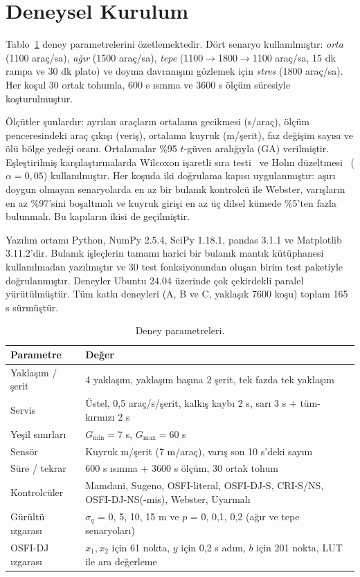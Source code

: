 \documentclass[11pt,a4paper]{article}
\theoremstyle{definition}
\newcommand{\osfis}{OSFI-DJ-S}
\newcommand{\osfins}{OSFI-DJ-NS}
\begin{document}
\section{Deneysel Kurulum}
\label{sec:setup}

Tablo~\ref{tab:setup} deney parametrelerini özetlemektedir. Dört senaryo kullanılmıştır: \emph{orta} (1100 araç/sa), \emph{ağır} (1500 araç/sa), \emph{tepe} (1100$\to$1800$\to$1100 araç/sa, 15 dk rampa ve 30 dk plato) ve doyma davranışını gözlemek için \emph{stres} (1800 araç/sa). Her koşul 30 ortak tohumla, 600 s ısınma ve 3600 s ölçüm süresiyle koşturulmuştur.

Ölçütler şunlardır: ayrılan araçların ortalama gecikmesi (s/araç), ölçüm penceresindeki araç çıkışı (veriş), ortalama kuyruk (m/şerit), faz değişim sayısı ve ölü bölge yedeği oranı. Ortalamalar \%95 $t$-güven aralığıyla (GA) verilmiştir. Eşleştirilmiş karşılaştırmalarda Wilcoxon işaretli sıra testi~\cite{wilcoxon1945} ve Holm düzeltmesi~\cite{holm1979} ($\alpha=0{,}05$) kullanılmıştır. Her koşuda iki doğrulama kapısı uygulanmıştır: aşırı doygun olmayan senaryolarda en az bir bulanık kontrolcü ile Webster, varışların en az \%97'sini boşaltmalı ve kuyruk girişi en az üç dilsel kümede \%5'ten fazla bulunmalı. Bu kapıların ikisi de geçilmiştir.

Yazılım ortamı Python, NumPy 2.5.4, SciPy 1.18.1, pandas 3.1.1 ve Matplotlib 3.11.2'dir. Bulanık işleçlerin tamamı harici bir bulanık mantık kütüphanesi kullanılmadan yazılmıştır ve 30 test fonksiyonundan oluşan birim test paketiyle doğrulanmıştır. Deneyler Ubuntu 24.04 üzerinde çok çekirdekli paralel yürütülmüştür. Tüm katkı deneyleri (A, B ve C, yaklaşık 7600 koşu) toplam 165 s sürmüştür.

\begin{table}[t]
\centering
\caption{Deney parametreleri.}
\label{tab:setup}
\small
\begin{tabular}{@{}ll@{}}
\toprule
Parametre & Değer \\
\midrule
Yaklaşım / şerit & 4 yaklaşım, yaklaşım başına 2 şerit, tek fazda tek yaklaşım \\
Servis & Üstel, 0,5 araç/s/şerit, kalkış kaybı 2 s, sarı 3 s + tüm-kırmızı 2 s \\
Yeşil sınırları & $G_{\min}=7$ s, $G_{\max}=60$ s \\
Sensör & Kuyruk m/şerit (7 m/araç), varış son 10 s'deki sayım \\
Süre / tekrar & 600 s ısınma + 3600 s ölçüm, 30 ortak tohum \\
Kontrolcüler & Mamdani, Sugeno, OSFI-literal, \osfis, CRI-S/NS, \osfins(-mis), Webster, Uyarmalı \\
Gürültü ızgarası & $\sigma_q$ = 0, 5, 10, 15 m ve $p$ = 0, 0,1, 0,2 (ağır ve tepe senaryoları) \\
OSFI-DJ ızgarası & $x_1,x_2$ için 61 nokta, $y$ için 0,2 s adım, $b$ için 201 nokta, LUT ile ara değerleme \\
\bottomrule
\end{tabular}
\end{table}
\end{document}
